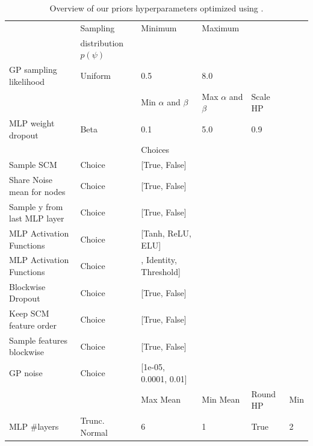\documentclass{article}
\begin{document}
\begin{table}[]
\small
    \centering
    \caption{Overview of our priors hyperparameters optimized using \priortuning{}.}
    \begin{tabular}{llllll}
    \toprule
    {} & Sampling & Minimum & Maximum & & \\
    {} & distribution $p(\psi)$ &  &  & & \\
    \midrule
    GP sampling likelihood &                         Uniform &     0.5 &     8.0 & & \\
    \toprule
    {} &  & Min $\alpha$ and $\beta$ & Max $\alpha$ and $\beta$ & Scale HP & \\
    \midrule
    MLP weight dropout &                       Beta &                    0.1 &                    5.0 &            0.9 & \\
    \toprule
    {} &  & Choices &  &  &  \\
    \midrule
    Sample SCM &                     Choice &                                      [True, False] & & & \\
    Share Noise mean for nodes &                     Choice &                                      [True, False] & & & \\
    Sample y from last MLP layer         &                     Choice &                                      [True, False] & & &  \\
    MLP Activation Functions                   &                     Choice &  \tiny [Tanh, ReLU, ELU]& & &  \\
    MLP Activation Functions                   &                     Choice &  \tiny , Identity, Threshold] & & &  \\
    Blockwise Dropout                       &                     Choice &                                      [True, False] & & &  \\
    Keep SCM feature order                  &                     Choice &                                      [True, False] & & &  \\
    Sample features blockwise          &                     Choice &                                      [True, False] & & &  \\
    GP noise                                &                     Choice &                              \tiny  [1e-05, 0.0001, 0.01] & & & \\
    \toprule
    {} &  & Max Mean & Min Mean & Round HP & Min \\
    \midrule
    MLP \#layers                 &      Trunc. Normal &        6 &        1 &        True &           2 \\

\end{tabular}
\end{table}
\end{document}
